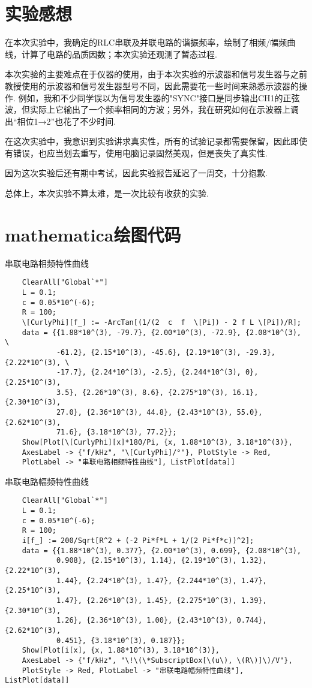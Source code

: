 \documentclass[11pt]{article}
\begin{document}
\section{实验感想}
在本次实验中，我确定的RLC串联及并联电路的谐振频率，绘制了相频/幅频曲线，计算了电路的品质因数；本次实验还观测了暂态过程.

本次实验的主要难点在于仪器的使用，由于本次实验的示波器和信号发生器与之前教授使用的示波器和信号发生器型号不同，因此需要花一些时间来熟悉示波器的操作. 例如，我和不少同学误以为信号发生器的"SYNC"接口是同步输出CH1的正弦波，但实际上它输出了一个频率相同的方波；另外，我在研究如何在示波器上调出“相位1→2”也花了不少时间.

在这次实验中，我意识到实验讲求真实性，所有的试验记录都需要保留，因此即使有错误，也应当划去重写，使用电脑记录固然美观，但是丧失了真实性.

因为这次实验后还有期中考试，因此实验报告延迟了一周交，十分抱歉.

总体上，本次实验不算太难，是一次比较有收获的实验.


\newpage
{}

\appendix

\section{mathematica绘图代码}

串联电路相频特性曲线
\begin{lstlisting}
	ClearAll["Global`*"]
	L = 0.1;
	c = 0.05*10^(-6);
	R = 100;
	\[CurlyPhi][f_] := -ArcTan[(1/(2  c  f  \[Pi]) - 2 f L \[Pi])/R];
	data = {{1.88*10^(3), -79.7}, {2.00*10^(3), -72.9}, {2.08*10^(3), \
			-61.2}, {2.15*10^(3), -45.6}, {2.19*10^(3), -29.3}, {2.22*10^(3), \
			-17.7}, {2.24*10^(3), -2.5}, {2.244*10^(3), 0}, {2.25*10^(3), 
			3.5}, {2.26*10^(3), 8.6}, {2.275*10^(3), 16.1}, {2.30*10^(3), 
			27.0}, {2.36*10^(3), 44.8}, {2.43*10^(3), 55.0}, {2.62*10^(3), 
			71.6}, {3.18*10^(3), 77.2}};
	Show[Plot[\[CurlyPhi][x]*180/Pi, {x, 1.88*10^(3), 3.18*10^(3)}, 
	AxesLabel -> {"f/kHz", "\[CurlyPhi]/°"}, PlotStyle -> Red, 
	PlotLabel -> "串联电路相频特性曲线"], ListPlot[data]]
\end{lstlisting}

串联电路幅频特性曲线
\begin{lstlisting}
	ClearAll["Global`*"]
	L = 0.1;
	c = 0.05*10^(-6);
	R = 100;
	i[f_] := 200/Sqrt[R^2 + (-2 Pi*f*L + 1/(2 Pi*f*c))^2];
	data = {{1.88*10^(3), 0.377}, {2.00*10^(3), 0.699}, {2.08*10^(3), 
			0.908}, {2.15*10^(3), 1.14}, {2.19*10^(3), 1.32}, {2.22*10^(3), 
			1.44}, {2.24*10^(3), 1.47}, {2.244*10^(3), 1.47}, {2.25*10^(3), 
			1.47}, {2.26*10^(3), 1.45}, {2.275*10^(3), 1.39}, {2.30*10^(3), 
			1.26}, {2.36*10^(3), 1.00}, {2.43*10^(3), 0.744}, {2.62*10^(3), 
			0.451}, {3.18*10^(3), 0.187}};
	Show[Plot[i[x], {x, 1.88*10^(3), 3.18*10^(3)}, 
	AxesLabel -> {"f/kHz", "\!\(\*SubscriptBox[\(u\), \(R\)]\)/V"}, 
	PlotStyle -> Red, PlotLabel -> "串联电路幅频特性曲线"], ListPlot[data]]
\end{lstlisting}
\end{document}
